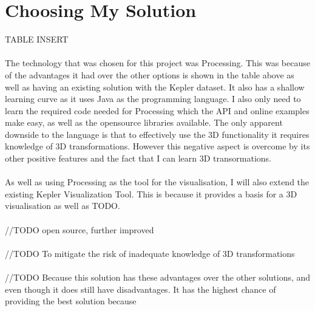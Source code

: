 \documentclass[11pt
              , a4paper
              , twoside
              , openright
              ]{report}
\begin{document}
\section{Choosing My Solution}
TABLE INSERT
\\\\
The technology that was chosen for this project was Processing. This was because of the advantages it had over the other options is shown in the table above as well as having an existing solution with the Kepler dataset. It also has a shallow learning curve as it uses Java as the programming language. I also only need to learn the required code needed for Processing which the API and online examples make easy, as well as the opensource libraries available. The only apparent downside to the language is that to effectively use the 3D functionality it requires knowledge of 3D transformations. However this negative aspect is overcome by its other positive features and the fact that I can learn 3D transormations.
\\\\
As well as using Processing as the tool for the visualisation, I will also extend the existing Kepler Visualization Tool. This is because it provides a basis for a 3D visualisation as well as TODO.
\\\\
//TODO open source, further improved
\\\\
//TODO To mitigate the risk of inadequate knowledge of 3D transformations
\\\\
//TODO Because this solution has these advantages over the other solutions, and even though it does still have disadvantages. It has the highest chance of providing the best solution because 
\end{document}
